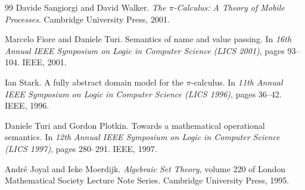 \documentclass[11pt]{article}
\theoremstyle{plain}
\theoremstyle{definition}
\begin{document}
\begin{thebibliography}{99}
 Davide Sangiorgi and David Walker. \emph{The $\pi$-Calculus: A Theory
of Mobile Processes}. Cambridge University Press, 2001.

 Marcelo Fiore and Daniele Turi. Semantics of name and value
passing. In \emph{16th Annual IEEE Symposium on Logic in Computer Science (LICS
2001)}, pages 93--104. IEEE, 2001.

 Ian Stark. A fully abstract domain model for the $\pi$-calculus.
In \emph{11th Annual IEEE Symposium on Logic in Computer Science (LICS 1996)},
pages 36--42. IEEE, 1996.

 Daniele Turi and Gordon Plotkin. Towards a mathematical
operational semantics. In \emph{12th Annual IEEE Symposium on Logic in Computer
Science (LICS 1997)}, pages 280--291. IEEE, 1997.

 André Joyal and Ieke Moerdijk. \emph{Algebraic Set Theory}, volume
220 of London Mathematical Society Lecture Note Series. Cambridge University
Press, 1995.

\end{thebibliography}
\end{document}
